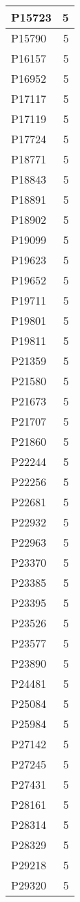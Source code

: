 \documentclass[
]{book}
\theoremstyle{definition}
\theoremstyle{definition}
\theoremstyle{definition}
\theoremstyle{definition}
\theoremstyle{remark}
\begin{document}
\begin{table}
\begin{tabular}{l|r}
\hline
P15723 & 5\\
\hline
P15790 & 5\\
\hline
P16157 & 5\\
\hline
P16952 & 5\\
\hline
P17117 & 5\\
\hline
P17119 & 5\\
\hline
P17724 & 5\\
\hline
P18771 & 5\\
\hline
P18843 & 5\\
\hline
P18891 & 5\\
\hline
P18902 & 5\\
\hline
P19099 & 5\\
\hline
P19623 & 5\\
\hline
P19652 & 5\\
\hline
P19711 & 5\\
\hline
P19801 & 5\\
\hline
P19811 & 5\\
\hline
P21359 & 5\\
\hline
P21580 & 5\\
\hline
P21673 & 5\\
\hline
P21707 & 5\\
\hline
P21860 & 5\\
\hline
P22244 & 5\\
\hline
P22256 & 5\\
\hline
P22681 & 5\\
\hline
P22932 & 5\\
\hline
P22963 & 5\\
\hline
P23370 & 5\\
\hline
P23385 & 5\\
\hline
P23395 & 5\\
\hline
P23526 & 5\\
\hline
P23577 & 5\\
\hline
P23890 & 5\\
\hline
P24481 & 5\\
\hline
P25084 & 5\\
\hline
P25984 & 5\\
\hline
P27142 & 5\\
\hline
P27245 & 5\\
\hline
P27431 & 5\\
\hline
P28161 & 5\\
\hline
P28314 & 5\\
\hline
P28329 & 5\\
\hline
P29218 & 5\\
\hline
P29320 & 5\\

\end{tabular}
\end{table}
\end{document}
